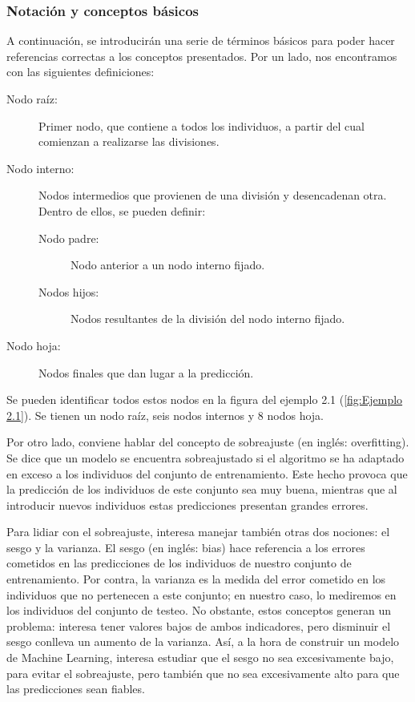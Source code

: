 \documentclass[12pt,twoside]{article}
\begin{document}
\subsubsection{Notación y conceptos básicos}

A continuación, se introducirán una serie de términos básicos para poder hacer referencias correctas a los conceptos presentados. Por un lado, nos encontramos con las siguientes definiciones:
\begin{description}
\item[Nodo raíz: ]Primer nodo, que contiene a todos los individuos, a partir del cual comienzan a realizarse las divisiones.
\item[Nodo interno: ]Nodos intermedios que provienen de una división y desencadenan otra. Dentro de ellos, se pueden definir:
	\begin{description}
	\item[Nodo padre: ]Nodo anterior a un nodo interno fijado.
	\item[Nodos hijos: ]Nodos resultantes de la división del nodo interno fijado.
	\end{description}
\item[Nodo hoja: ]Nodos finales que dan lugar a la predicción.
\end{description}

Se pueden identificar todos estos nodos en la figura del ejemplo 2.1 (\ref{fig:Ejemplo 2.1}). Se tienen un nodo raíz, seis nodos internos y 8 nodos hoja.

Por otro lado, conviene hablar del concepto de sobreajuste (en inglés: overfitting). Se dice que un modelo se encuentra sobreajustado si el algoritmo se ha adaptado en exceso a los individuos del conjunto de entrenamiento. Este hecho provoca que la predicción de los individuos de este conjunto sea muy buena, mientras que al introducir nuevos individuos estas predicciones presentan grandes errores.

Para lidiar con el sobreajuste, interesa manejar también otras dos nociones: el sesgo y la varianza. El sesgo (en inglés: bias) hace referencia a los errores cometidos en las predicciones de los individuos de nuestro conjunto de entrenamiento. Por contra, la varianza es la medida del error cometido en los individuos que no pertenecen a este conjunto; en nuestro caso, lo mediremos en los individuos del conjunto de testeo. No obstante, estos conceptos generan un problema: interesa tener valores bajos de ambos indicadores, pero disminuir el sesgo conlleva un aumento de la varianza. Así, a la hora de construir un modelo de Machine Learning, interesa estudiar que el sesgo no sea excesivamente bajo, para evitar el sobreajuste, pero también que no sea excesivamente alto para que las predicciones sean fiables.
\end{document}
